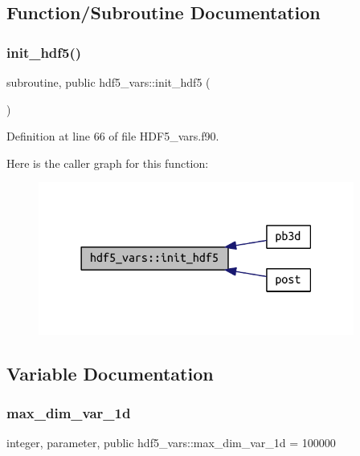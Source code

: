 \subsection{Function/\+Subroutine Documentation}
\mbox{\label{namespacehdf5__vars_ab644703bcb67ce423732e39ab56a4b63}} 
\subsubsection{\texorpdfstring{init\+\_\+hdf5()}{init\_hdf5()}}
{\footnotesize\ttfamily subroutine, public hdf5\+\_\+vars\+::init\+\_\+hdf5 (\begin{DoxyParamCaption}{ }\end{DoxyParamCaption})}



Definition at line 66 of file H\+D\+F5\+\_\+vars.\+f90.

Here is the caller graph for this function\+:
\nopagebreak
\begin{figure}[H]
\begin{center}
\leavevmode
\includegraphics[width=294pt]{namespacehdf5__vars_ab644703bcb67ce423732e39ab56a4b63_icgraph}
\end{center}
\end{figure}


\subsection{Variable Documentation}
\mbox{\label{namespacehdf5__vars_a69c36b36ad7f55ff124ebc328d18adb7}} 
\subsubsection{\texorpdfstring{max\+\_\+dim\+\_\+var\+\_\+1d}{max\_dim\_var\_1d}}
{\footnotesize\ttfamily integer, parameter, public hdf5\+\_\+vars\+::max\+\_\+dim\+\_\+var\+\_\+1d = 100000}



